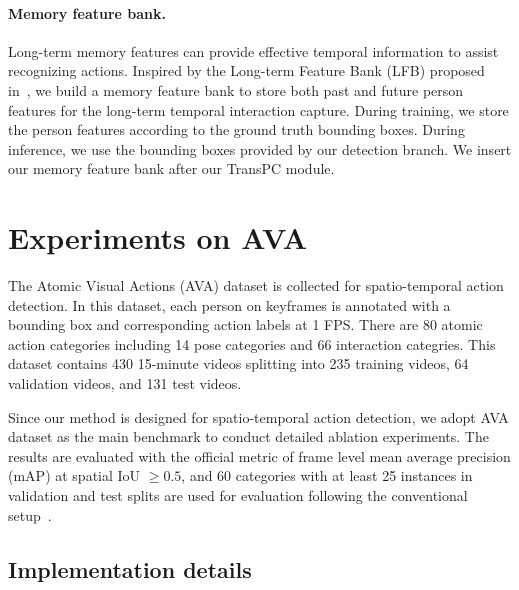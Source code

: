 \documentclass[final]{cvpr}
\begin{document}
\paragraph{Memory feature bank.}
Long-term memory features can provide effective temporal information to assist recognizing actions. Inspired by the Long-term Feature Bank (LFB) proposed in~\cite{Wu_2019_CVPR}, we build a memory feature bank to store both past and future person features for the long-term temporal interaction capture. During training, we store the person features according to the ground truth bounding boxes. During inference, we use the bounding boxes provided by our detection branch. We insert our memory feature bank after our TransPC module.

\section{Experiments on AVA}
The Atomic Visual Actions (AVA) \cite{DBLP:conf/cvpr/GuSRVPLVTRSSM18} dataset is collected for spatio-temporal action detection. In this dataset, each person on keyframes is annotated with a bounding box and corresponding action labels at 1 FPS. There are 80 atomic action categories including 14 pose categories and 66 interaction categries. This dataset contains 430 15-minute videos splitting into 235 training videos, 64 validation videos, and 131 test videos.

Since our method is designed for spatio-temporal action detection, we adopt AVA dataset as the main benchmark to conduct detailed ablation experiments. The results are evaluated with the official metric of frame level mean average precision (mAP) at spatial IoU $\ge 0.5$, and 60 categories with at least 25 instances in validation and test splits are used for evaluation following the conventional setup~\cite{DBLP:conf/cvpr/GuSRVPLVTRSSM18}.

\subsection{Implementation details}
\label{4.2}
\end{document}
